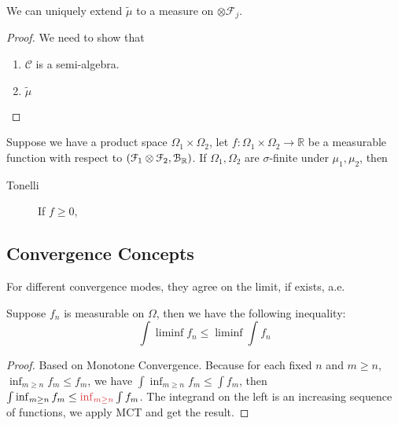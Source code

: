 \begin{thm}
    We can uniquely extend \(\tilde{\mu}\) to a measure on \(\otimes \mathcal{F}_{j}\). 
\end{thm}
\begin{proof}
    We need to show that 
    \begin{enumerate}
        \item \(\mathcal{C}\) is a semi-algebra.
        \item \(\tilde{\mu} \) 
    \end{enumerate}
\end{proof}


\begin{thm}
    Suppose we have a product space \(\Omega_{1}\times \Omega_{2}\), let \(f: \Omega_{1}\times \Omega_{2} \to \mathbb{R}\) be a measurable function with respect to \(\pqty{\mathcal{F}_{1} \otimes \mathcal{F}_{2}, \mathcal{B}_{\mathbb{R}}}\). If \(\Omega_{1}, \Omega_{2}\) are \(\sigma\)-finite under \(\mu_{1}, \mu_{2}\), then
    \begin{description}
        \item[Tonelli] If \(f\geq 0\), 
    \end{description}
\end{thm}

\subsection{Convergence Concepts}

\begin{proposition}
    For different convergence modes, they agree on the limit, if exists, a.e. 
\end{proposition}


\begin{thm}
    Suppose \(f_{n}\) is measurable on \(\Omega\), then we have the following inequality:
    \begin{equation*}
        \int \liminf f_{n}\leq \liminf \int f_{n} 
    \end{equation*}
\end{thm}
\begin{proof}
    Based on Monotone Convergence. Because for each fixed \(n\) and \(m \geq n\), \(\inf_{m\geq n} f_{m} \leq f_{m}\), we have \(\int \inf_{m\geq n} f_{m} \leq \int f_{m}\), then \(\int \inf_{m\geq n} f_{m} \leq \red{\inf_{m \geq n}}\int f_{m}\). The integrand on the left is an increasing sequence of functions, we apply MCT and get the result. 
\end{proof}

